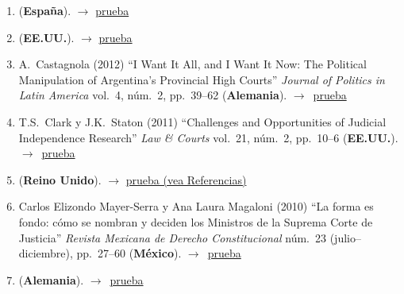 \documentclass[12 pt, letter]{article}
\newenvironment{CitasMiTrabajo}{
    \begin{footnotesize}
    \begin{enumerate}[label={\footnotesize\emph{cita~\arabic*}},ref=\arabic*] %
        \setlength{\itemsep}{.1\itemsep}
        \setlength{\parskip}{.1\parskip}
    }{\end{enumerate}\end{footnotesize}}
\begin{document}
        \begin{CitasMiTrabajo}

        \item {} (\textbf{Espa\~na}). $\rightarrow$ \href{http://dx.doi.org/10.18042/cepc/aijc.20.03}{prueba}
          
        \item {} (\textbf{EE.UU.}). $\rightarrow$ \href{https://github.com/emagar/cv/blob/master/citasMiTrab/sanchMagalMagarChapter/carroll.tiedeVotingTribChile2012jhr.pdf}{prueba}

        \item A.~Castagnola (2012) ``I Want It All, and I Want It Now: The Political Manipulation of Argentina's Provincial High Courts'' \emph{Journal of Politics in Latin America} vol.~4, n\'um.~2, pp.~39--62 (\textbf{Alemania}). $\rightarrow$~\href{https://github.com/emagar/cv/blob/master/citasMiTrab/sanchMagalMagarChapter/castagnolaArgProvCourts2012jpla.pdf}{prueba}

        \item T.S.~Clark y J.K.~Staton  (2011) ``Challenges and Opportunities of Judicial Independence Research'' \emph{Law \& Courts} vol.~21, n\'um.~2, pp.~10--6 (\textbf{EE.UU.}). $\rightarrow$~\href{https://github.com/emagar/cv/blob/master/citasMiTrab/sanchMagalMagarChapter/clark.staton2011.pdf}{prueba}

        \item {} (\textbf{Reino Unido}). $\rightarrow$ \href{https://www.cambridge.org/core/journals/asian-journal-of-law-and-society/article/measuring-judicial-ideal-points-in-new-democracies-the-case-of-the-philippines/8E51C7D52349D1B554D2F2C33D347EC9}{prueba (vea Referencias)}

        \item Carlos Elizondo Mayer-Serra y Ana Laura Magaloni (2010) ``La forma es fondo: c\'omo se nombran y deciden los Ministros de la Suprema Corte de Justicia'' \emph{Revista Mexicana de Derecho Constitucional} n\'um.~23 (julio--diciembre), pp.~27--60 (\textbf{M\'exico}). $\rightarrow$~\href{https://github.com/emagar/cv/blob/master/citasMiTrab/sanchMagalMagarChapter/MAGALONIELIZONDO2010cc23.pdf}{prueba}

          \item {} (\textbf{Alemania}). $\rightarrow$~\href{https://www.researchgate.net/profile/Laarni_Escresa/publication/263970563_Judicial_Politics_in_Unstable_Democracies_The_Case_of_the_Philippine_Supreme_Court_An_Empirical_Analysis_1986-2010/links/55b3ca4b08ae092e9653b175/Judicial-Politics-in-Unstable-Democracies-The-Case-of-the-Philippine-Supreme-Court-An-Empirical-Analysis-1986-2010.pdf}{prueba}
          

\end{CitasMiTrabajo}
\end{document}
